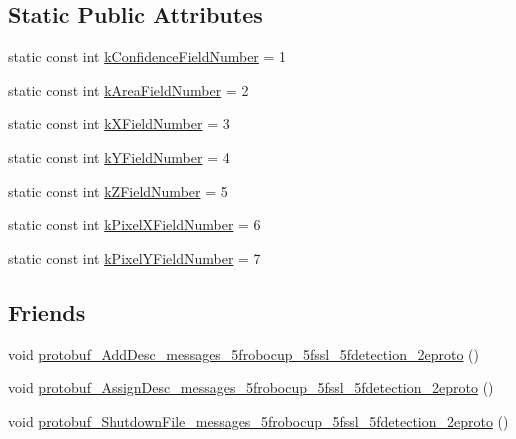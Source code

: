 \subsection*{Static Public Attributes}
\begin{DoxyCompactItemize}
\item 
static const int \hyperlink{class_s_s_l___detection_ball_a1f190390922d06e11aa9f078f03da0f8}{k\-Confidence\-Field\-Number} = 1
\item 
static const int \hyperlink{class_s_s_l___detection_ball_a368442ecfe19e281907b07d73224a80d}{k\-Area\-Field\-Number} = 2
\item 
static const int \hyperlink{class_s_s_l___detection_ball_a72a5d2a5623ffe1d875b7557165891b7}{k\-X\-Field\-Number} = 3
\item 
static const int \hyperlink{class_s_s_l___detection_ball_a1807e55eb02410fcb4da6fcdfbc7f649}{k\-Y\-Field\-Number} = 4
\item 
static const int \hyperlink{class_s_s_l___detection_ball_a8a8f8051324f8b78f966c189359c1a40}{k\-Z\-Field\-Number} = 5
\item 
static const int \hyperlink{class_s_s_l___detection_ball_a449e17061b28aacf47f0730d9360fcea}{k\-Pixel\-X\-Field\-Number} = 6
\item 
static const int \hyperlink{class_s_s_l___detection_ball_a48123b9ce7753bda53a2e6f73ea912b7}{k\-Pixel\-Y\-Field\-Number} = 7
\end{DoxyCompactItemize}
\subsection*{Friends}
\begin{DoxyCompactItemize}
\item 
void \hyperlink{class_s_s_l___detection_ball_a238ecf23556fbaa6d77409838dbb8e59}{protobuf\-\_\-\-Add\-Desc\-\_\-messages\-\_\-5frobocup\-\_\-5fssl\-\_\-5fdetection\-\_\-2eproto} ()
\item 
void \hyperlink{class_s_s_l___detection_ball_a8c97dea58197fa3da2e50d8a912299bd}{protobuf\-\_\-\-Assign\-Desc\-\_\-messages\-\_\-5frobocup\-\_\-5fssl\-\_\-5fdetection\-\_\-2eproto} ()
\item 
void \hyperlink{class_s_s_l___detection_ball_a2e69f2df742d8d46e426bbf86248ca01}{protobuf\-\_\-\-Shutdown\-File\-\_\-messages\-\_\-5frobocup\-\_\-5fssl\-\_\-5fdetection\-\_\-2eproto} ()
\end{DoxyCompactItemize}


